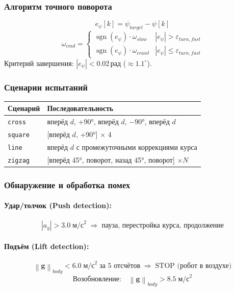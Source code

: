 \documentclass[12pt, a4paper]{article}
\DeclareMathOperator{\sgn}{sgn}
\newcommand{\norm}[1]{\left\lVert#1\right\rVert}
\begin{document}
\subsubsection{Алгоритм точного поворота}
\begin{equation}
  e_\psi[k] = \psi_{target} - \psi[k]
\end{equation}
\begin{equation}
  \omega_{cmd} =
  \begin{cases}
    \sgn(e_\psi)\cdot\omega_{slow} & |e_\psi| > \varepsilon_{turn,fast} \\
    \sgn(e_\psi)\cdot\omega_{crawl} & |e_\psi| \leq \varepsilon_{turn,fast}
  \end{cases}
\end{equation}
Критерий завершения: $|e_\psi| < 0.02$\,рад ($\approx 1.1^\circ$).

\subsubsection{Сценарии испытаний}
\begin{center}
\begin{tabular}{lp{9cm}}
\toprule
\textbf{Сценарий} & \textbf{Последовательность} \\
\midrule
\texttt{cross}   & вперёд $d$, +90°, вперёд $d$, $-90°$, вперёд $d$ \\
\texttt{square}  & [вперёд $d$, +90°] $\times$ 4 \\
\texttt{line}    & вперёд $d$ с промежуточными коррекциями курса \\
\texttt{zigzag}  & [вперёд 45°, поворот, назад 45°, поворот] $\times N$ \\
\bottomrule
\end{tabular}
\end{center}

\subsubsection{Обнаружение и обработка помех}

\paragraph{Удар/толчок (Push detection):}
\begin{equation}
  |a_y| > 3.0\;\text{м/с}^2 \;\Rightarrow\; \text{пауза, перестройка курса, продолжение}
\end{equation}

\paragraph{Подъём (Lift detection):}
\begin{equation}
  \norm{\mathbf{g}}_{body} < 6.0\;\text{м/с}^2 \;\text{за 5 отсчётов}
  \;\Rightarrow\; \text{STOP (робот в воздухе)}
\end{equation}
\begin{equation}
  \text{Возобновление:}\quad \norm{\mathbf{g}}_{body} > 8.5\;\text{м/с}^2
\end{equation}
\end{document}
